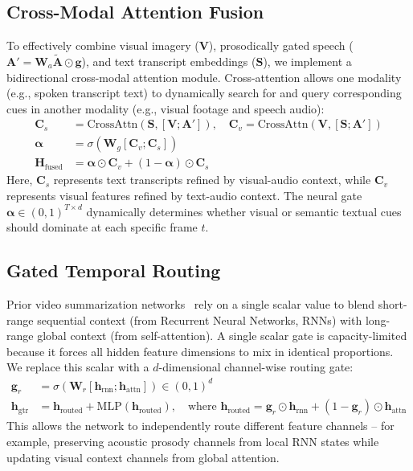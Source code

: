 \documentclass[letterpaper]{article}
\begin{document}
\subsection{Cross-Modal Attention Fusion}

To effectively combine visual imagery ($\mathbf{V}$), prosodically gated speech ($\mathbf{A}' = \mathbf{W}_a\tilde{\mathbf{A}} \odot \mathbf{g}$), and text transcript embeddings ($\mathbf{S}$), we implement a bidirectional cross-modal attention module. Cross-attention allows one modality (e.g., spoken transcript text) to dynamically search for and query corresponding cues in another modality (e.g., visual footage and speech audio):
\begin{align}
\mathbf{C}_s &= \text{CrossAttn}(\mathbf{S}, [\mathbf{V}; \mathbf{A}']), \quad
\mathbf{C}_v = \text{CrossAttn}(\mathbf{V}, [\mathbf{S}; \mathbf{A}']) \\
\boldsymbol{\alpha} &= \sigma(\mathbf{W}_g[\mathbf{C}_v;\mathbf{C}_s]) \\
\mathbf{H}_{\text{fused}} &= \boldsymbol{\alpha} \odot \mathbf{C}_v + (1-\boldsymbol{\alpha}) \odot \mathbf{C}_s
\end{align}
Here, $\mathbf{C}_s$ represents text transcripts refined by visual-audio context, while $\mathbf{C}_v$ represents visual features refined by text-audio context. The neural gate $\boldsymbol{\alpha} \in (0,1)^{T \times d}$ dynamically determines whether visual or semantic textual cues should dominate at each specific frame $t$.

\subsection{Gated Temporal Routing}

Prior video summarization networks~\cite{zhou2018deep} rely on a single scalar value to blend short-range sequential context (from Recurrent Neural Networks, RNNs) with long-range global context (from self-attention). A single scalar gate is capacity-limited because it forces all hidden feature dimensions to mix in identical proportions. We replace this scalar with a $d$-dimensional channel-wise routing gate:
\begin{align}
\mathbf{g}_r &= \sigma(\mathbf{W}_r[\mathbf{h}_{\text{rnn}};\mathbf{h}_{\text{attn}}]) \in (0,1)^d \\
\mathbf{h}_{\text{gtr}} &= \mathbf{h}_{\text{routed}} + \text{MLP}(\mathbf{h}_{\text{routed}}), \quad
\text{where } \mathbf{h}_{\text{routed}} = \mathbf{g}_r \odot \mathbf{h}_{\text{rnn}} + (1-\mathbf{g}_r) \odot \mathbf{h}_{\text{attn}}
\end{align}
This allows the network to independently route different feature channels -- for example, preserving acoustic prosody channels from local RNN states while updating visual context channels from global attention.
\end{document}
